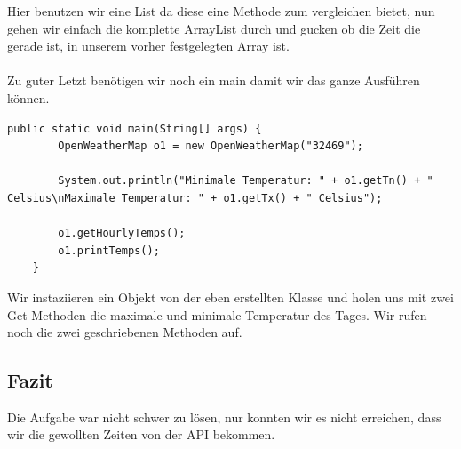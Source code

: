 Hier benutzen wir eine List da diese eine Methode zum vergleichen bietet, nun gehen wir einfach die komplette ArrayList durch und gucken ob die Zeit die gerade ist, in unserem vorher festgelegten Array ist.\\\\

Zu guter Letzt benötigen wir noch ein main damit wir das ganze Ausführen können.

\begin{lstlisting}
public static void main(String[] args) {
        OpenWeatherMap o1 = new OpenWeatherMap("32469");

        System.out.println("Minimale Temperatur: " + o1.getTn() + " Celsius\nMaximale Temperatur: " + o1.getTx() + " Celsius");

        o1.getHourlyTemps();
        o1.printTemps();
    }
\end{lstlisting} 

Wir instaziieren ein Objekt von der eben erstellten Klasse und holen uns mit zwei Get-Methoden die maximale und minimale Temperatur des Tages. Wir rufen noch die zwei geschriebenen Methoden auf.

\subsection{Fazit}
Die Aufgabe war nicht schwer zu lösen, nur konnten wir es nicht erreichen, dass wir die gewollten Zeiten von der API bekommen.